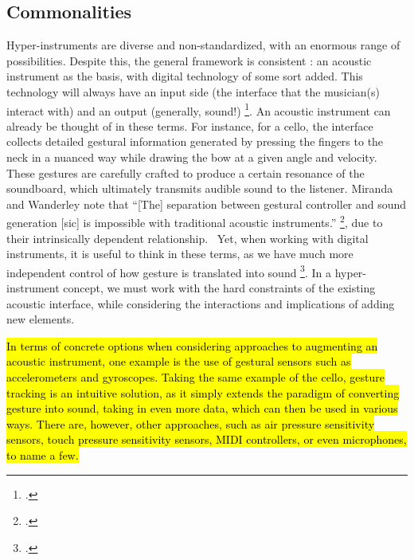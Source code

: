 \documentclass[12pt,twoside,maitrise]{dms_ks}
\theoremstyle{definition}
\begin{document}
\subsection{Commonalities}

Hyper-instruments are diverse and non-standardized, with an enormous range of possibilities.  
Despite this, the general framework is consistent : an acoustic instrument as the basis, with digital technology of some sort added. 
This technology will always have an input side (the interface that the musician(s) interact with) and an output (generally, sound!) \footcite[3]{miranda_new_2006}. 
An acoustic instrument can already be thought of in these terms.
For instance, for a cello, the interface collects detailed gestural information generated by pressing the fingers to the neck in a nuanced way while drawing the bow at a given angle and velocity. 
These gestures are carefully crafted to produce a certain resonance of the soundboard, which ultimately transmits audible sound to the listener. 
Miranda and Wanderley note that “[The] separation between gestural controller and sound generation [sic] is impossible with traditional acoustic instruments.” \footcite[3]{miranda_new_2006}, due to their intrinsically dependent relationship.~
Yet, when working with digital instruments, it is useful to think in these terms, as we have much more independent control of how gesture is translated into sound \footcite[24--25]{jorda_digital_2005}.
In a hyper-instrument concept, we must work with the hard constraints of the existing acoustic interface, while considering the interactions and implications of adding new elements. 

\hl{In terms of concrete options when considering approaches to augmenting an acoustic instrument, one example is the use of gestural sensors such as accelerometers and gyroscopes. 
Taking the same example of the cello, gesture tracking is an intuitive solution, as it simply extends the paradigm of converting gesture into sound, taking in even more data, which can then be used in various ways. 
There are, however, other approaches, such as air pressure sensitivity sensors, touch pressure sensitivity sensors, MIDI controllers, or even microphones, to name a few.} 
\end{document}
